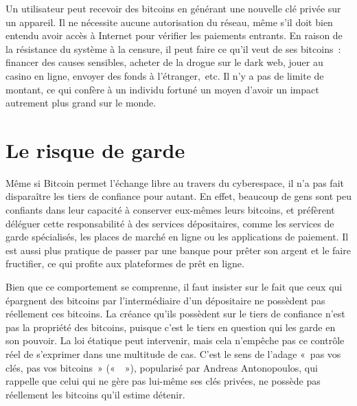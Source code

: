 Un utilisateur peut recevoir des bitcoins en générant une nouvelle clé privée sur un appareil. Il ne nécessite aucune autorisation du réseau, même s'il doit bien entendu avoir accès à Internet pour vérifier les paiements entrants. En raison de la résistance du système à la censure, il peut faire ce qu'il veut de ses bitcoins~: financer des causes sensibles, acheter de la drogue sur le dark web, jouer au casino en ligne, envoyer des fonds à l'étranger,~etc. Il n'y a pas de limite de montant, ce qui confère à un individu fortuné un moyen d'avoir un impact autrement plus grand sur le monde.

\section*{Le risque de garde}

Même si Bitcoin permet l'échange libre au travers du cyberespace, il n'a pas fait disparaître les tiers de confiance pour autant. En effet, beaucoup de gens sont peu confiants dans leur capacité à conserver eux-mêmes leurs bitcoins, et préfèrent déléguer cette responsabilité à des services dépositaires, comme les services de garde spécialisés, les places de marché en ligne ou les applications de paiement. Il est aussi plus pratique de passer par une banque pour prêter son argent et le faire fructifier, ce qui profite aux plateformes de prêt en ligne.

Bien que ce comportement se comprenne, il faut insister sur le fait que ceux qui épargnent des bitcoins par l'intermédiaire d'un dépositaire ne possèdent pas réellement ces bitcoins. La créance qu'ils possèdent sur le tiers de confiance n'est pas la propriété des bitcoins, puisque c'est le tiers en question qui les garde en son pouvoir. La loi étatique peut intervenir, mais cela n'empêche pas ce contrôle réel de s'exprimer dans une multitude de cas. C'est le sens de l'adage «~pas vos clés, pas vos bitcoins~» («~~»), popularisé par Andreas Antonopoulos, qui rappelle que celui qui ne gère pas lui-même ses clés privées, ne possède pas réellement les bitcoins qu'il estime détenir. %

